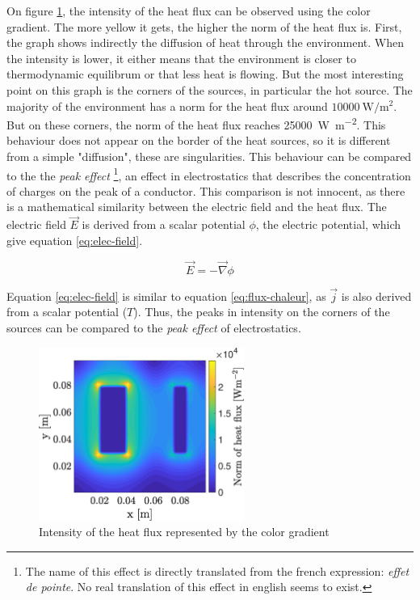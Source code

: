 \documentclass[a4paper,12pt,twoside]{article}
\begin{document}
On figure \ref{fig:c-heat-flux}, the intensity of the heat flux can be observed using the color gradient.
The more yellow it gets, the higher the norm of the heat flux is. %
First, the graph shows indirectly the diffusion of heat through the environment.
When the intensity is lower, it either means that the environment is closer to thermodynamic equilibrum or that less heat is flowing. %
But the most interesting point on this graph is the corners of the sources, in particular the hot source.
The majority of the environment has a norm for the heat flux around $\SI{10000}{\watt\per\square\meter}$. But on these corners, the norm of the heat flux reaches \SI{25000}{\watt\per\square\meter}.
This behaviour does not appear on the border of the heat sources, so it is different from a simple "diffusion", these are singularities. %
This behaviour can be compared to the the \textit{peak effect} \footnote{The name of this effect is directly translated from the french expression: \textit{effet de pointe}. No real translation of this effect in english seems to exist.}, an effect in electrostatics that describes the concentration of charges on the peak of a conductor.
This comparison is not innocent, as there is a mathematical similarity between the electric field and the heat flux.
The electric field $\vec{E}$ is derived from a scalar potential $\phi$, the electric potential, which give equation \eqref{eq:elec-field}.

\begin{equation}
  \vec{E} = -\vec{\nabla}\phi
  \label{eq:elec-field}
\end{equation}

Equation \eqref{eq:elec-field} is similar to equation \eqref{eq:flux-chaleur}, as $\vec{j}$ is also derived from a scalar potential ($T$).
Thus, the peaks in intensity on the corners of the sources can be compared to the \textit{peak effect} of electrostatics.

\begin{figure}[h]
  \centering
  \includegraphics[width=0.6\textwidth]{graphs/c_heat_flux.eps}
  \caption{Intensity of the heat flux represented by the color gradient}
  \label{fig:c-heat-flux}
\end{figure}
\end{document}
